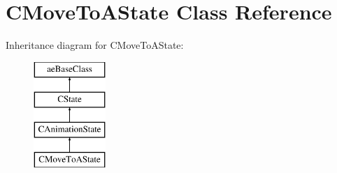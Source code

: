 \hypertarget{class_c_move_to_a_state}{}\section{C\+Move\+To\+A\+State Class Reference}
\label{class_c_move_to_a_state}
Inheritance diagram for C\+Move\+To\+A\+State\+:\begin{figure}[H]
\begin{center}
\leavevmode
\includegraphics[height=4.000000cm]{class_c_move_to_a_state}
\end{center}
\end{figure}
